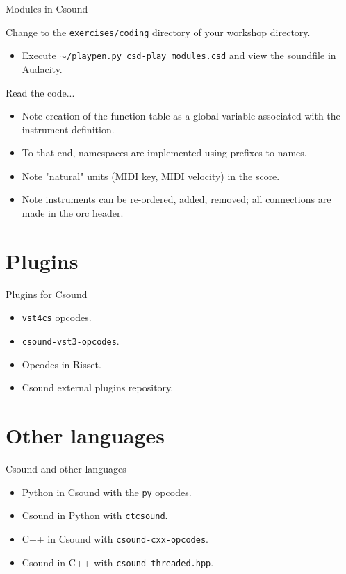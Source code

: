 \documentclass{beamer}
\begin{document}
\begin{frame}{Modules in Csound}
\begin{example}
Change to the \texttt{exercises/coding} directory of your workshop directory.
\begin{itemize}
\item Execute \texttt{$\sim$/playpen.py csd-play modules.csd} and view the soundfile in Audacity.
\end{itemize}
Read the code...
\begin{itemize}
\item Note creation of the function table as a global variable associated with the instrument definition.
\item To that end, namespaces are implemented using prefixes to names.
\item Note "natural" units (MIDI key, MIDI velocity) in the score.
\item Note instruments can be re-ordered, added, removed; all connections are made in the orc header.
\end{itemize}
\end{example}
\end{frame}

\section{Plugins}
\begin{frame}{Plugins for Csound}
\begin{itemize}
\item \texttt{vst4cs} opcodes.
\item \texttt{csound-vst3-opcodes}.
\item Opcodes in Risset.
\item Csound external plugins repository.
\end{itemize}
\end{frame}

\section{Other languages}
\begin{frame}{Csound and other languages}
\begin{itemize}
\item Python in Csound with the \texttt{py} opcodes.
\item Csound in Python with \texttt{ctcsound}.
\item C++ in Csound with \texttt{csound-cxx-opcodes}.
\item Csound in C++ with \texttt{csound\_threaded.hpp}.
\end{itemize}
\end{frame}
\end{document}
